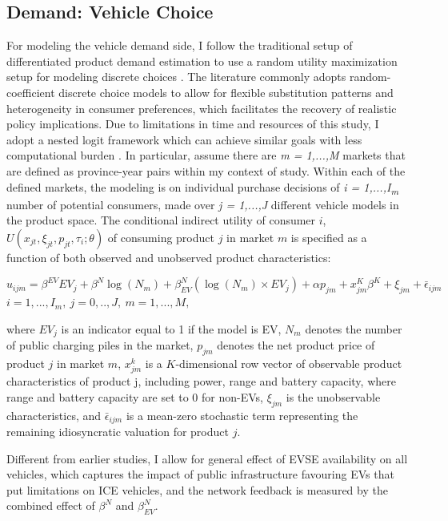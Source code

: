 \documentclass[12pt]{article}
\begin{document}
    \subsection{Demand: Vehicle Choice}
    \hspace*{\parindent}For modeling the vehicle demand side, I follow the traditional setup of differentiated product demand estimation to use a random utility maximization setup for modeling discrete choices \citep{berry_estimating_1994, gandhi_empirical_2021}. 
The literature commonly adopts random-coefficient discrete choice models to allow for flexible substitution patterns and heterogeneity in consumer preferences, 
which facilitates the recovery of realistic policy implications. Due to limitations in time and resources of this study, I adopt a nested logit framework which can achieve similar goals with less computational burden \citep{grigolon_nested_2014}.
In particular, assume there are \textit{m = 1,...,M} markets that are defined as province-year pairs within my context of study. Within each of the defined markets, the modeling is on individual purchase decisions of \textit{i = 1,...,I\textsubscript{m}} number of potential consumers, 
made over \textit{j = 1,...,J} different vehicle models in the product space. The conditional indirect utility of consumer $i$, $U(x_{jt}, \xi_{jt}, p_{jt}, \tau_i; \theta)$ of consuming product $j$ in market $m$ is specified as a function of both observed and unobserved product characteristics:

\begin{equation}
    u_{ijm} = \beta^{EV} EV_j+ \beta^N \log(N_m) + \beta^N_{EV} (\log(N_m) \times EV_j) + \alpha p_{jm} + x^{K}_{jm} \beta^{K} + \xi_{jm} + \bar{\epsilon}_{ijm}
\end{equation}
$i = 1,...,I_m, \ j = 0,..,J, \ m = 1,...,M,$

where $EV_j$ is an indicator equal to 1 if the model is EV, $N_{m}$ denotes the number of public charging piles in the market, 
$p_{jm}$ denotes the net product price of product $j$ in market $m$, 
$x^{k}_{jm}$ is a $K$-dimensional row vector of observable product characteristics of product j,
including power, range and battery capacity, where range and battery capacity are set to 0 for non-EVs, 
$\xi_{jm}$ is the unobservable characteristics,
and $\bar{\epsilon}_{ijm}$ is a mean-zero stochastic term representing the remaining idiosyncratic valuation for product $j$. 

Different from earlier studies, I allow for general effect of EVSE availability on all vehicles,
which captures the impact of public infrastructure favouring EVs that put limitations on ICE vehicles,
and the network feedback is measured by the combined effect of $\beta^N$ and $\beta^N_{EV}$.
\end{document}
